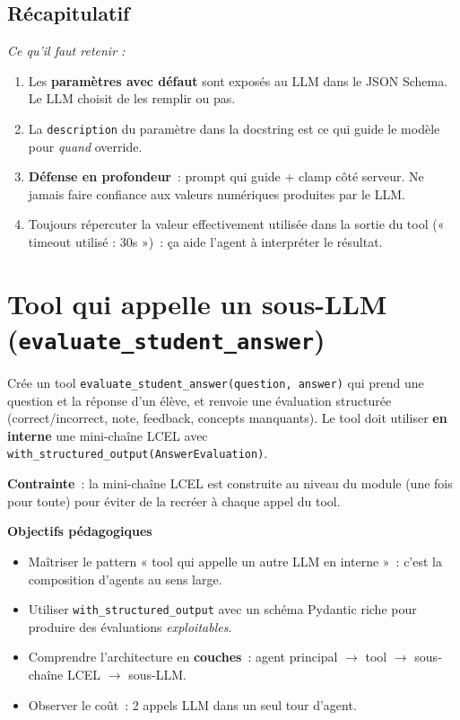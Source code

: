\documentclass[11pt,a4paper]{article}
\begin{document}
\subsection*{Récapitulatif}
{\itshape\sloppy
\textit{Ce qu'il faut retenir :}
\begin{enumerate}[leftmargin=*]
  \item Les \textbf{paramètres avec défaut} sont exposés au LLM dans le
        JSON Schema. Le LLM choisit de les remplir ou pas.
  \item La \texttt{description} du paramètre dans la docstring est ce
        qui guide le modèle pour \emph{quand} override.
  \item \textbf{Défense en profondeur}~: prompt qui guide + clamp côté
        serveur. Ne jamais faire confiance aux valeurs numériques
        produites par le LLM.
  \item Toujours répercuter la valeur effectivement utilisée dans la
        sortie du tool (« timeout utilisé : 30s »)~: ça aide l'agent
        à interpréter le résultat.
\end{enumerate}
\par}

\section{Tool qui appelle un sous-LLM (\texttt{evaluate\_student\_answer})}

\begin{tcolorbox}[title=Exercice bonus 4. Composer un agent et un sous-LLM dans un tool]
Crée un tool \texttt{evaluate\_student\_answer(question, answer)} qui
prend une question et la réponse d'un élève, et renvoie une évaluation
structurée (correct/incorrect, note, feedback, concepts manquants). Le
tool doit utiliser \textbf{en interne} une mini-chaîne LCEL avec
\texttt{with\_structured\_output(AnswerEvaluation)}.

\textbf{Contrainte}~: la mini-chaîne LCEL est construite au niveau du
module (une fois pour toute) pour éviter de la recréer à chaque appel
du tool.

\bigskip
\noindent\textbf{Objectifs pédagogiques}
\begin{itemize}[leftmargin=*]
  \item Maîtriser le pattern « tool qui appelle un autre LLM en
        interne »~: c'est la composition d'agents au sens large.
  \item Utiliser \texttt{with\_structured\_output} avec un schéma
        Pydantic riche pour produire des évaluations \emph{exploitables}.
  \item Comprendre l'architecture en \textbf{couches}~: agent principal
        $\to$ tool $\to$ sous-chaîne LCEL $\to$ sous-LLM.
  \item Observer le coût~: 2 appels LLM dans un seul tour d'agent.
\end{itemize}
\end{tcolorbox}
\end{document}
